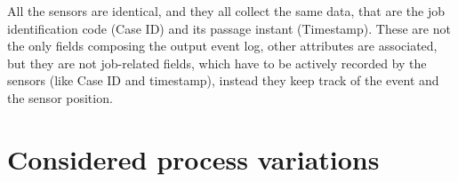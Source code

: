 All the sensors are identical, and they all collect the same data, that are the job identification code (Case ID) and its passage instant (Timestamp). These are not the only fields composing the output event log, other attributes are associated, but they are not job-related fields, which have to be actively recorded by the sensors (like Case ID and timestamp), instead they keep track of the event and the sensor position. \\
\section{Considered process variations}
